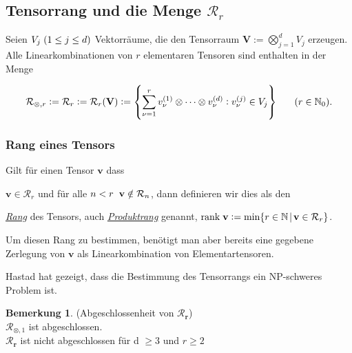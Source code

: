 \documentclass[11pt]{article} %
\theoremstyle{definition}
\newtheorem{rmk}[thm]{Bemerkung}
\numberwithin{equation}{section}
\begin{document}
\subsection{Tensorrang und die Menge $\mathcal{R}_{r}$}
\begin{changemargin}{0pt}{0pt}

Seien $V_{j} \hspace{1mm} (1\leq j \leq d)$ Vektorräume, die den Tensorraum $\mathbf{V} := \bigotimes^{d}_{j=1} V_{j}$ erzeugen. Alle Linearkombinationen
von $r$ elementaren Tensoren sind enthalten in der Menge

\[\mathcal{R}_{\otimes,r} := \mathcal{R}_{r} := \mathcal{R}_{r}(\mathbf{V}) := \left\{ \sum^{r}_{\nu=1} v^{(1)}_{\nu} \otimes \dots \otimes v^{(d)}_{\nu} : v^{(j)}_{\nu} \in V_{j} \right\} \hspace{6mm} (r \in \mathbb{N}_{0}).\]

\subsubsection{Rang eines Tensors}

Gilt für einen Tensor $\mathbf{v}$ dass

$ \mathbf{v} \in \mathcal{R}_{r}$ und für alle $n<r \hspace{2mm} \mathbf{v} \notin \mathcal{R}_{n}$, dann definieren wir dies als den

\textit{\underline{Rang}} des Tensors, auch \textit{\underline{Produktrang}} genannt,
 $\text{rank} \hspace{1mm} \mathbf{v} := \min\{ r \in \mathbb{N} \hspace{0.5mm} | \hspace{0.5mm} \mathbf{v} \in \mathcal{R}_{r} \}$.

Um diesen Rang zu bestimmen, benötigt man aber bereits eine gegebene Zerlegung von $\mathbf{v}$ als Linearkombination von Elementartensoren.

Hastad \cite{hastad} hat gezeigt, dass die Bestimmung des Tensorrangs ein NP-schweres Problem ist.

\begin{rmk} (Abgeschlossenheit von $\mathcal{R}_{\mathbf{r}}$)
\\$\mathcal{R}_{\otimes,1}$ ist abgeschlossen.
\\$\mathcal{R}_{\mathbf{r}}$ ist nicht abgeschlossen für d $\geq 3$ und $r \geq 2$
\end{rmk}


\end{changemargin}
\end{document}
